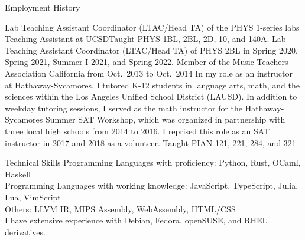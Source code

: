 \documentclass{cv}
\begin{document}
\begin{block}{Employment History}
  \begin{entries}
      {Lab Teaching Assistant Coordinator (LTAC/Head TA) of the PHYS 1-series
      labs}
      {Teaching Assistant at UCSD}{Taught PHYS 1BL, 2BL, 2D, 10, and 140A. Lab
      Teaching Assistant Coordinator (LTAC/Head TA) of PHYS 2BL in Spring 2020,
      Spring 2021, Summer I 2021, and Spring 2022.}
      {Member of the Music Teachers Association California from Oct.\ 2013 to Oct.\ 2014}
      {In my role as an instructor at Hathaway-Sycamores, I tutored K-12
      students in language arts, math, and the sciences within the Los Angeles
      Unified School District (LAUSD). In addition to weekday tutoring sessions,
      I served as the math instructor for the Hathaway-Sycamores Summer SAT
      Workshop, which was organized in partnership with three local high schools
      from 2014 to 2016. I reprised this role as an SAT instructor in 2017 and
      2018 as a volunteer.}
      {Taught PIAN 121, 221, 284, and 321}
  \end{entries}
\end{block}

\begin{block}{Technical Skills}
  Programming Languages with proficiency: Python, Rust, OCaml, Haskell\\
  Programming Languages with working knowledge: JavaScript, TypeScript, Julia, Lua, VimScript\\
  Others: LLVM IR, MIPS Assembly, WebAssembly, HTML/CSS\\
  I have extensive experience with Debian, Fedora, openSUSE, and
  RHEL derivatives.
\end{block}

\begin{refsection}
  \nocite{*}
  \printbibliography[title=Peer Reviewed Publications]
\end{refsection}

\begin{refsection}[submitted]
  \nocite{*}
  \printbibliography[title=Publications Under Review]
\end{refsection}

\begin{refsection}[talks]
  \nocite{*}
  \printbibliography[title=Talks and Presentations]
\end{refsection}
\end{document}
